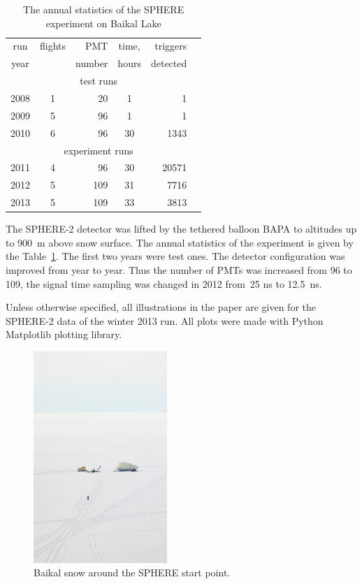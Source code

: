 \documentclass[final,5p,times,twocolumn]{elsarticle}
\begin{document}
\begin{table}[b]
\centering
\caption{The annual statistics of the SPHERE experiment on Baikal Lake}
\label{tab:statistics}
\vspace{1pc}
\begin{tabular}{|c||c|r|c|r|r|}
\hline
run  & flights & PMT    & time, & triggers \\ 
year &         & number & hours & detected \\ 
\hline \hline
\multicolumn{5}{|c|}{test runs} \\
\hline
2008 & 1 &  20 &  1 &     1 \\ 
2009 & 5 &  96 &  1 &     1 \\ 
2010 & 6 &  96 & 30 &  1343 \\
\hline
\multicolumn{5}{|c|}{experiment runs} \\
\hline
2011 & 4 &  96 & 30 & 20571 \\
2012 & 5 & 109 & 31 &  7716 \\
2013 & 5 & 109 & 33 &  3813 \\
\hline
\end{tabular}
\end{table}


The \mbox{SPHERE-2} detector was lifted by the tethered balloon BAPA to altitudes up to 900~m above snow surface. The annual statistics of the experiment is given by the Table~\ref{tab:statistics}. The first two years were test ones. The detector configuration was improved from year to year. Thus the number of PMTs was increased from 96 to 109, the signal time sampling was changed in 2012 from~25 ns to 12.5~ns.

Unless otherwise specified, all illustrations in the paper are given for the \mbox{SPHERE-2} data of the winter 2013 run. All plots were made with Python Matplotlib plotting library.

\begin{figure}[tb]
    \includegraphics[width=0.45\textwidth]{figs/DSC_4049.jpg}\hspace{2pc}%
    \caption{Baikal snow around the SPHERE start point.}
\label{fig:baikal_snow}
\end{figure}
\end{document}
